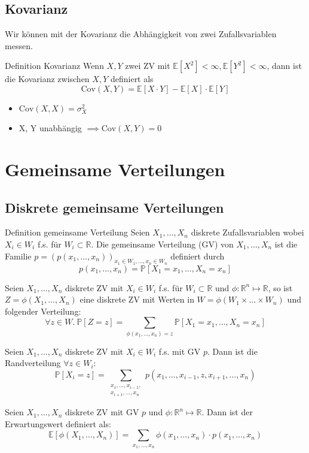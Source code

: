 \documentclass[a4paper,10pt]{article}
\def\R{\mathbb{R}}
\def\P{\mathbb{P}}
\def\E{\mathbb{E}}
\begin{document}
\subsection{Kovarianz}
Wir können mit der Kovarianz die Abhängigkeit von zwei Zufallsvariablen messen.
\begin{subbox}{Definition Kovarianz}
    Wenn \(X, Y\) zwei ZV mit \(\E[X^2] < \infty, \E[Y^2] < \infty\), dann ist die Kovarianz zwischen \(X, Y\) definiert als
    \[\text{Cov}(X,Y) = \E[X \cdot Y] - \E[X] \cdot \E[Y]\]
\end{subbox}
\begin{itemize}
    \item \(\text{Cov}(X,X) = \sigma_X^2\)
    \item X, Y unabhängig \(\implies \text{Cov}(X,Y) = 0\)
\end{itemize}

\section{Gemeinsame Verteilungen}
\subsection{Diskrete gemeinsame Verteilungen}
\begin{subbox}{Definition gemeinsame Verteilung}
    Seien \(X_1, \ldots, X_n\) diskrete Zufallsvariablen wobei \(X_i \in W_i\) f.s. für \(W_i \subset \R\). Die gemeinsame Verteilung (GV) von \(X_1, \ldots, X_n\) ist die Familie \(p = (p(x_1, \ldots, x_n))_{x_1 \in W_1, \ldots, x_n \in W_n}\) definiert durch
    \[p(x_1, \ldots, x_n) = \P[X_1 = x_1, \ldots, X_n = x_n]\]
\end{subbox}

Seien \(X_1,\ldots,X_n\) diskrete ZV mit \(X_i \in W_i\) f.s. für \(W_i \subset \R\) und \(\phi: \R^n \mapsto \R\), so ist \(Z = \phi(X_1, \ldots, X_n)\) eine diskrete ZV mit Werten in \(W = \phi(W_1 \times \ldots \times W_n)\) und folgender Verteilung:
\[\forall z \in W. \ \P[Z = z] = \sum_{\phi(x_1, \ldots, x_n) = z} \P[X_1 = x_1, \ldots, X_n = x_n]\]

Seien \(X_1,\ldots,X_n\) diskrete ZV mit \(X_i \in W_i\) f.s. mit GV \(p\). Dann ist die Randverteilung \(\forall z \in W_i\):
\[\P[X_i = z] = \sum_{\substack{x_1, \ldots, x_{i-1}, \\x_{i+1},\ldots,x_n}} p(x_1, \ldots, x_{i-1}, z, x_{i+1},\ldots,x_n)\]

Seien \(X_1,\ldots,X_n\) diskrete ZV mit GV \(p\) und \(\phi : \R^n \mapsto \R\). Dann ist der Erwartungswert definiert als:
\[\E[\phi(X_1, \ldots, X_n)] = \sum_{x_1,\ldots,x_n} \phi(x_1,\ldots,x_n) \cdot p(x_1,\ldots,x_n)\]
\end{document}
